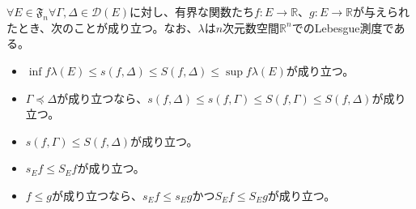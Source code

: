 \documentclass[dvipdfmx]{jsarticle}
\begin{document}
\begin{thm}\label{4.6.5.11}
$\forall E \in \mathfrak{F}_{n}\forall\varGamma,\varDelta \in \mathcal{D}(E)$に対し、有界な関数たち$f:E \rightarrow \mathbb{R}$、$g:E \rightarrow \mathbb{R}$が与えられたとき、次のことが成り立つ。なお、$\lambda$は$n$次元数空間$\mathbb{R}^{n}$でのLebesgue測度である。
\begin{itemize}
\item
  $\inf f\lambda(E) \leq s(f,\varDelta) \leq S(f,\varDelta) \leq \sup f\lambda(E)$が成り立つ。
\item
  $\varGamma \preccurlyeq \varDelta$が成り立つなら、$s(f,\varDelta) \leq s(f,\varGamma) \leq S(f,\varGamma) \leq S(f,\varDelta)$が成り立つ。
\item
  $s(f,\varGamma) \leq S(f,\varDelta)$が成り立つ。
\item
  $s_{E}f \leq S_{E}f$が成り立つ。
\item
  $f \leq g$が成り立つなら、$s_{E}f \leq s_{E}g$かつ$S_{E}f \leq S_{E}g$が成り立つ。
\end{itemize}
\end{thm}
\end{document}
